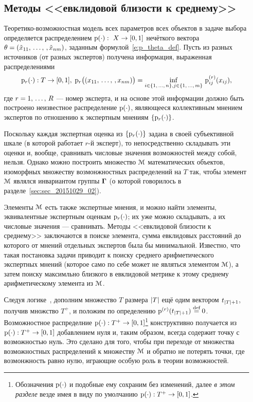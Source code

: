 \subsection{Методы <<евклидовой близости к среднему>>}
\label{easy_collective_matrix_vector}

Теоретико-возможностная модель всех параметров всех объектов в задаче выбора определяется распределением ${\mathrm{p}}(\cdot):\ X\to[0,1]$ нечёткого вектора $\theta = (\tilde x_{11}, \, \ldots,\,, \tilde x_{nm})$, заданным формулой~\ref{e:p_theta_def}. Пусть из разных источников (от разных экспертов) получена информация, выраженная распределениями 
\begin{equation}
\label{pr_theta_def}
	{\mathrm{p}}_r(\cdot): T \rightarrow [0,1],\; {\mathrm{p}}_r \big((x_{11}, \, \ldots,\,, x_{nm})\big) =  \inf_{i \in \{1,\, \ldots,\, n\}, j \in \{1,\, \ldots,\, m\}}\,{\mathrm{p}}^{(r)}_{ij}(x_{ij}), 
\end{equation}
где $r = 1,\, \ldots,\, R$ --- номер эксперта, и на основе этой информации должно быть построено неизвестное распределение ${\mathrm{p}}(\cdot)$, являющееся коллективным мнением экспертов по отношению к экспертным мнениям $\{{\mathrm{p}}_r(\cdot)\}$. 

Поскольку каждая экспертная оценка из $\{{\mathrm{p}}_r(\cdot)\}$ задана в своей субъективной шкале (в которой работает $r$-й эксперт), то непосредственно складывать эти оценки и, вообще, сравнивать числовые значения возможностей между собой, нельзя. Однако можно построить множество ${\EuScript{M}}$ математических объектов, изоморфных множеству возмонжностных распределений на $T$ так, чтобы элемент ${\EuScript{M}}$ являлся инвариантом группы $\boldsymbol{\Gamma}$ (о которой говорилось в разделе~\ref{sec:sec_20151029_02}). 

Элементы ${\EuScript{M}}$ есть также экспертные мнения, и можно найти элементы, эквивалентные экспертным оценкам ${\mathrm{p}}_r(\cdot)$; их уже можно складывать, а их числовые значения --- сравнивать. Методы <<евклидовой близости к среднему>> заключаются в поиске элемента, сумма евклидовых расстояний до которого от мнений отдельных экспертов была бы минимальной. Известно, что такая постановка задачи приводит к поиску среднего арифметического экспертных мнений (которое само по себе может не являться элементом ${\EuScript{M}}$), а затем поиску максимльно близкого в евклидовой метрике к этому среднему арифметическому элемента из ${\EuScript{M}}$.  

Следуя логике~\cite{pytyev_experts}, дополним множество $T$ размера $\left| T \right|$ ещё одим вектором $t_{\left| T \right|+1}$, получив множство $T^+$, и положим по определению ${\mathrm{p}}^{(r)}(t_{\left| T \right|+1}) \overset{\text{def}}{=} 0$. Возможностное распределние ${\mathrm{p}}(\cdot): T^+ \to[0,1]$\footnote{Обозначения ${\mathrm{p}}(\cdot)$ и подобные ему сохраним без изменений, далее \emph{в этом разделе} везде имея в виду по умолчанию ${\mathrm{p}}(\cdot): T^+ \to[0,1]$.} конструктивно получается из ${\mathrm{p}}(\cdot): T^+ \to[0,1]$ добавлением нуля и, таким образом, всегда содержит точку с возможностью нуль. Это сделано для того, чтобы при переходе от множества возможностных распределений к множеству ${\EuScript{M}}$ и обратно не потерять точки, где возмонжность равно нулю, играющие особую роль в теории возможностей.

